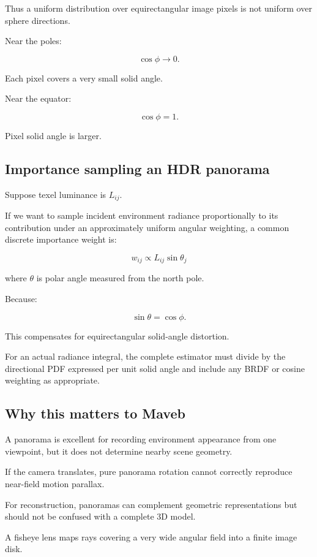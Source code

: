 Thus a uniform distribution over equirectangular image pixels is not uniform over sphere directions.

Near the poles:

\[ \cos\phi\to0. \]

Each pixel covers a very small solid angle.

Near the equator:

\[ \cos\phi=1. \]

Pixel solid angle is larger.

\subsection{Importance sampling an HDR panorama}\label{02-foundations-ii-ch035-importance-sampling-an-hdr-panorama}

Suppose texel luminance is \(L_{ij}\).

If we want to sample incident environment radiance proportionally to its contribution under an approximately uniform angular weighting, a common discrete importance weight is:

\[ \boxed{ w_{ij}\propto L_{ij}\sin\theta_j } \]

where \(\theta\) is polar angle measured from the north pole.

Because:

\[ \sin\theta=\cos\phi. \]

This compensates for equirectangular solid-angle distortion.

For an actual radiance integral, the complete estimator must divide by the directional PDF expressed per unit solid angle and include any BRDF or cosine weighting as appropriate.

\subsection{Why this matters to Maveb}\label{02-foundations-ii-ch035-why-this-matters-to-maveb}

A panorama is excellent for recording environment appearance from one viewpoint, but it does not determine nearby scene geometry.

If the camera translates, pure panorama rotation cannot correctly reproduce near-field motion parallax.

For reconstruction, panoramas can complement geometric representations but should not be confused with a complete 3D model.

A fisheye lens maps rays covering a very wide angular field into a finite image disk.

